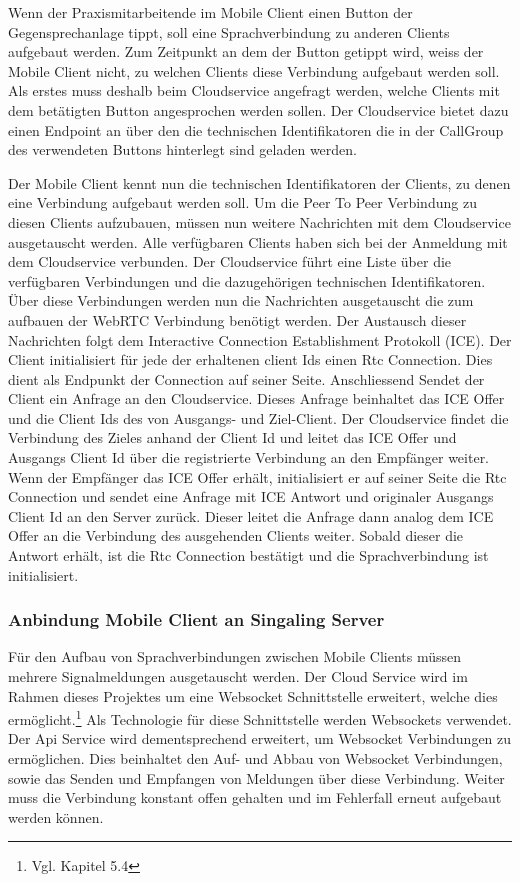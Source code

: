 Wenn der Praxismitarbeitende im Mobile Client einen Button der Gegensprechanlage tippt, soll eine Sprachverbindung zu anderen Clients aufgebaut werden.
Zum Zeitpunkt an dem der Button getippt wird, weiss der Mobile Client nicht, zu welchen Clients diese Verbindung aufgebaut werden soll.
Als erstes muss deshalb beim Cloudservice angefragt werden, welche Clients mit dem betätigten Button angesprochen werden sollen.
Der Cloudservice bietet dazu einen Endpoint an über den die technischen Identifikatoren die in der CallGroup des verwendeten Buttons hinterlegt sind geladen werden.

Der Mobile Client kennt nun die technischen Identifikatoren der Clients, zu denen eine Verbindung aufgebaut werden soll.
Um die Peer To Peer Verbindung zu diesen Clients aufzubauen, müssen nun weitere Nachrichten mit dem Cloudservice ausgetauscht werden.
Alle verfügbaren Clients haben sich bei der Anmeldung mit dem Cloudservice verbunden.
Der Cloudservice führt eine Liste über die verfügbaren Verbindungen und die dazugehörigen technischen Identifikatoren.
Über diese Verbindungen werden nun die Nachrichten ausgetauscht die zum aufbauen der WebRTC Verbindung benötigt werden.
Der Austausch dieser Nachrichten folgt dem Interactive Connection Establishment Protokoll (ICE).
Der Client initialisiert für jede der erhaltenen client Ids einen Rtc Connection.
Dies dient als Endpunkt der Connection auf seiner Seite.
Anschliessend Sendet der Client ein Anfrage an den Cloudservice.
Dieses Anfrage beinhaltet das ICE Offer und die Client Ids des von Ausgangs- und Ziel-Client.
Der Cloudservice findet die Verbindung des Zieles anhand der Client Id und leitet das ICE Offer und Ausgangs Client Id über die registrierte Verbindung an den Empfänger weiter.
Wenn der Empfänger das ICE Offer erhält, initialisiert er auf seiner Seite die Rtc Connection und sendet eine Anfrage mit ICE Antwort und originaler Ausgangs Client Id an den Server zurück.
Dieser leitet die Anfrage dann analog dem ICE Offer an die Verbindung des ausgehenden Clients weiter.
Sobald dieser die Antwort erhält, ist die Rtc Connection bestätigt und die Sprachverbindung ist initialisiert.

\clearpage


\subsubsection{Anbindung Mobile Client an Singaling Server}

Für den Aufbau von Sprachverbindungen zwischen Mobile Clients müssen mehrere Signalmeldungen ausgetauscht werden.
Der Cloud Service wird im Rahmen dieses Projektes um eine Websocket Schnittstelle erweitert, welche dies ermöglicht.\footnote{Vgl. Kapitel 5.4}
Als Technologie für diese Schnittstelle werden Websockets verwendet.
Der Api Service wird dementsprechend erweitert, um Websocket Verbindungen zu ermöglichen.
Dies beinhaltet den Auf- und Abbau von Websocket Verbindungen, sowie das Senden und Empfangen von Meldungen über diese Verbindung.
Weiter muss die Verbindung konstant offen gehalten und im Fehlerfall erneut aufgebaut werden können.

